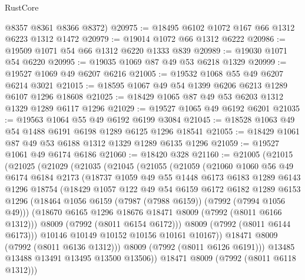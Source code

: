 \begin{lexlean}{RustCore}
\begin{coremodule}
      @8357
      @8361
      @8366
      @8372)
@20975 := @18495 @6102 @1072 @167 @66 @1312 @6223 @1312 @1472
@20979 := @19014 @1072 @66 @1312 @6222
@20986 := @19509 @1071 @54 @66 @1312 @6220 @1333 @839
@20989 := @19030 @1071 @54 @6220
@20995 := @19035 @1069 @87 @49 @53 @6218 @1329
@20999 := @19527 @1069 @49 @6207 @6216
@21005 := @19532 @1068 @55 @49 @6207 @6214 @3021
@21015 := @18595 @1067 @49 @54 @1399 @6206 @6213 @1289 @6107 @1296 @18608
@21025 := @18429 @1065 @87 @49 @53 @6203 @1312 @1329 @1289 @6117 @1296
@21029 := @19527 @1065 @49 @6192 @6201
@21035 := @19563 @1064 @55 @49 @6192 @6199 @3084
@21045 := @18528 @1063 @49 @54 @1488 @6191 @6198 @1289 @6125 @1296 @18541
@21055 := @18429 @1061 @87 @49 @53 @6188 @1312 @1329 @1289 @6135 @1296
@21059 := @19527 @1061 @49 @6174 @6186
@21060 := @18420 @328
@21160 := @21005
    (@21015
      (@21025
        (@21029
          (@21035
            (@21045
              (@21055
                (@21059
                  (@21060
                    @1060
                    @56
                    @49
                    @6174
                    @6184
                    @2173
                    (@18737
                      @1059
                      @49
                      @55
                      @1448
                      @6173
                      @6183
                      @1289
                      @6143
                      @1296
                      @18754
                      (@18429
                        @1057
                        @122
                        @49
                        @54
                        @6159
                        @6172
                        @6182
                        @1289
                        @6153
                        @1296
                        (@18464 @1056 @6159 (@7987 (@7988 @6159)) (@7992 (@7994 @1056 @49)))
                        (@18670 @6165 @1296 @18676 @18471 @8009 (@7992 (@8011 @6166 @1312)))
                        @8009
                        (@7992 (@8011 @6154 @6172)))
                      @8009
                      (@7992 (@8011 @6144 @6173)))
                    @10146
                    @10149
                    @10152
                    @10156
                    @10161
                    @10167))
                @18471
                @8009
                (@7992 (@8011 @6136 @1312)))
              @8009
              (@7992 (@8011 @6126 @6191)))
            @13485
            @13488
            @13491
            @13495
            @13500
            @13506))
        @18471
        @8009
        (@7992 (@8011 @6118 @1312)))

\end{coremodule}
\end{lexlean}
